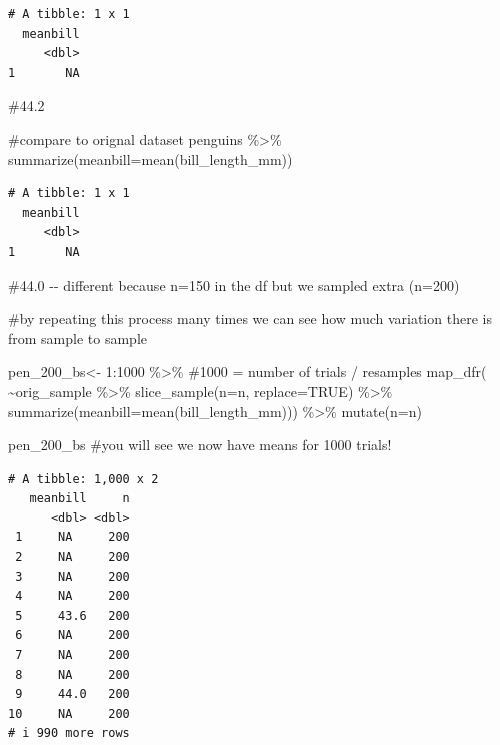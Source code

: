 \documentclass[
  letterpaper,
  DIV=11,
  numbers=noendperiod]{scrartcl}
\newenvironment{Shaded}{\begin{snugshade}}{\end{snugshade}}
\newcommand{\AttributeTok}[1]{\textcolor[rgb]{0.40,0.45,0.13}{#1}}
\newcommand{\CommentTok}[1]{\textcolor[rgb]{0.37,0.37,0.37}{#1}}
\newcommand{\ConstantTok}[1]{\textcolor[rgb]{0.56,0.35,0.01}{#1}}
\newcommand{\DecValTok}[1]{\textcolor[rgb]{0.68,0.00,0.00}{#1}}
\newcommand{\FunctionTok}[1]{\textcolor[rgb]{0.28,0.35,0.67}{#1}}
\newcommand{\NormalTok}[1]{\textcolor[rgb]{0.00,0.23,0.31}{#1}}
\newcommand{\OtherTok}[1]{\textcolor[rgb]{0.00,0.23,0.31}{#1}}
\newcommand{\SpecialCharTok}[1]{\textcolor[rgb]{0.37,0.37,0.37}{#1}}
\begin{document}
\begin{verbatim}
# A tibble: 1 x 1
  meanbill
     <dbl>
1       NA
\end{verbatim}

\begin{Shaded}
\begin{Highlighting}[]
\CommentTok{\#44.2}

\CommentTok{\#compare to orignal dataset}
\NormalTok{penguins }\SpecialCharTok{\%\textgreater{}\%}
  \FunctionTok{summarize}\NormalTok{(}\AttributeTok{meanbill=}\FunctionTok{mean}\NormalTok{(bill\_length\_mm))}
\end{Highlighting}
\end{Shaded}

\begin{verbatim}
# A tibble: 1 x 1
  meanbill
     <dbl>
1       NA
\end{verbatim}

\begin{Shaded}
\begin{Highlighting}[]
\CommentTok{\#44.0 {-}{-} different because n=150 in the df but we sampled extra (n=200)}

\CommentTok{\#by repeating this process many times we can see how much variation there is from sample to sample}

\NormalTok{pen\_200\_bs}\OtherTok{\textless{}{-}} \DecValTok{1}\SpecialCharTok{:}\DecValTok{1000} \SpecialCharTok{\%\textgreater{}\%} \CommentTok{\#1000 = number of trials / resamples}
  \FunctionTok{map\_dfr}\NormalTok{(}
    \SpecialCharTok{\textasciitilde{}}\NormalTok{orig\_sample }\SpecialCharTok{\%\textgreater{}\%}
      \FunctionTok{slice\_sample}\NormalTok{(}\AttributeTok{n=}\NormalTok{n, }\AttributeTok{replace=}\ConstantTok{TRUE}\NormalTok{) }\SpecialCharTok{\%\textgreater{}\%}
      \FunctionTok{summarize}\NormalTok{(}\AttributeTok{meanbill=}\FunctionTok{mean}\NormalTok{(bill\_length\_mm))) }\SpecialCharTok{\%\textgreater{}\%}
  \FunctionTok{mutate}\NormalTok{(}\AttributeTok{n=}\NormalTok{n)}

\NormalTok{pen\_200\_bs }\CommentTok{\#you will see we now have means for 1000 trials!}
\end{Highlighting}
\end{Shaded}

\begin{verbatim}
# A tibble: 1,000 x 2
   meanbill     n
      <dbl> <dbl>
 1     NA     200
 2     NA     200
 3     NA     200
 4     NA     200
 5     43.6   200
 6     NA     200
 7     NA     200
 8     NA     200
 9     44.0   200
10     NA     200
# i 990 more rows
\end{verbatim}
\end{document}
